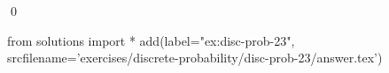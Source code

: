 
\begin{ex} 
  \label{ex:disc-prob-23}
  
  \qed
\end{ex} 
\begin{python0}
from solutions import *
add(label="ex:disc-prob-23",
    srcfilename='exercises/discrete-probability/disc-prob-23/answer.tex') 
\end{python0}
